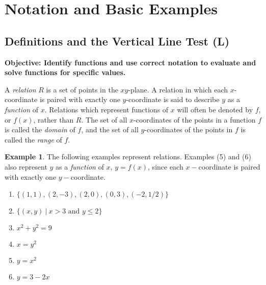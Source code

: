 \documentclass[12pt]{book}
\theoremstyle{definition}
\newtheorem{example}{Example}
\begin{document}
\section{Notation and Basic Examples}
\subsection{Definitions and the Vertical Line Test (L)}
%
{\bf Objective: Identify functions and use correct notation to evaluate and solve functions for specific values.}\par
A {\it relation} $R$ is a set of points in the $xy$-plane.  A relation in which each $x$-coordinate is paired with exactly one $y$-coordinate is said to describe $y$ as a {\it function} of $x$.  Relations which represent functions of $x$ will often be denoted by $f$, or $f(x)$, rather than $R$.  The set of all $x$-coordinates of the points in a function $f$ is called the {\it domain} of $f$, and the set of all $y$-coordinates of the points in $f$ is called the {\it range} of $f$.\par
\begin{example}
The following examples represent relations.  Examples (5) and (6) also represent $y$ as a {\it function} of $x$, $y=f(x)$, since each $x-$coordinate is paired with exactly one $y-$coordinate.
\begin{enumerate}
\item $\{(1,1),(2,-3),(2,0),(0,3),(-2,1/2)\}$
\item $\{(x,y)~|~x>3 \text{~and~} y\leq 2\}$
\item $x^2+y^2=9$
\item $x=y^2$
\item $y=x^2$
\item $y=3-2x$
\end{enumerate}
\end{example}
\end{document}
